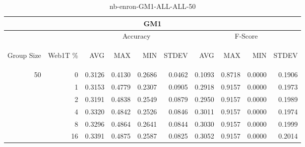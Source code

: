 \begin{center}
\begin{table}[htbp]
\begin{tabular}{ | r | r | r | r | r | r | r | r | r | r |}
\hline
\multicolumn{10}{|c|}{GM1}\\
\hline
 & & \multicolumn{4}{|c|}{Accuracy} & \multicolumn{4}{|c|}{F-Score}\\ \cline{3-10}
\begin{sideways}Group Size\end{sideways} & \begin{sideways}Web1T \%\end{sideways} & \begin{sideways}AVG\end{sideways} & \begin{sideways}MAX\end{sideways} & \begin{sideways}MIN\end{sideways} & \begin{sideways}STDEV\end{sideways} & \begin{sideways}AVG\end{sideways} & \begin{sideways}MAX\end{sideways} & \begin{sideways}MIN\end{sideways} & \begin{sideways}STDEV\end{sideways}\\
\hline
\multirow{6}{*}{50}
 & 0 & 0.3126 & 0.4130 & 0.2686 & 0.0462 & 0.1093 & 0.8718 & 0.0000 & 0.1906\\ \cline{2-10}
 & 1 & 0.3153 & 0.4779 & 0.2307 & 0.0905 & 0.2918 & 0.9157 & 0.0000 & 0.1973\\ \cline{2-10}
 & 2 & 0.3191 & 0.4838 & 0.2549 & 0.0879 & 0.2950 & 0.9157 & 0.0000 & 0.1989\\ \cline{2-10}
 & 4 & 0.3320 & 0.4842 & 0.2526 & 0.0846 & 0.3011 & 0.9157 & 0.0000 & 0.1974\\ \cline{2-10}
 & 8 & 0.3296 & 0.4864 & 0.2641 & 0.0844 & 0.3030 & 0.9157 & 0.0000 & 0.1999\\ \cline{2-10}
 & 16 & 0.3391 & 0.4875 & 0.2587 & 0.0825 & 0.3052 & 0.9157 & 0.0000 & 0.2014\\ \cline{2-10}
\hline
\end{tabular}
\caption{nb-enron-GM1-ALL-ALL-50}
\end{table}
\end{center}

